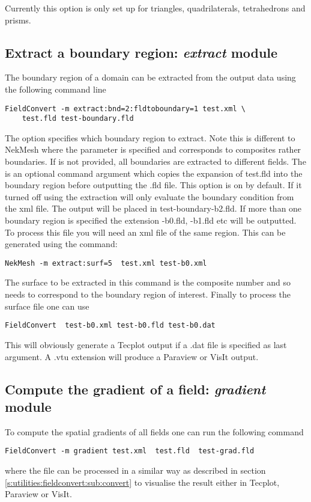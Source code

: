 \begin{notebox}
Currently this option is only set up for triangles, quadrilaterals,
tetrahedrons and prisms.
\end{notebox}

\subsection{Extract a boundary region: \textit{extract} module}
The boundary region of a domain can be extracted from the output
data using the following command line
%
\begin{lstlisting}[style=BashInputStyle]
FieldConvert -m extract:bnd=2:fldtoboundary=1 test.xml \
	test.fld test-boundary.fld
\end{lstlisting}
%
The option  specifies which boundary region to extract.
Note this is different to NekMesh where the parameter \inltt{surf}
is specified and corresponds to composites rather boundaries. If 
is not provided, all boundaries are extracted to different fields. The 
is an optional command argument which copies the expansion of test.fld into
the boundary region before outputting the .fld file. This option is on by default.
If it turned off using \inltt{fldtoboundary=0} the extraction will only evaluate the
boundary condition from the xml file. The output will be placed in test-boundary-b2.fld.
If more than one boundary region is specified the extension -b0.fld, -b1.fld etc will be
outputted. To process this file you will need an xml file of the same region.
This can be generated using the command:
%
\begin{lstlisting}[style=BashInputStyle]
NekMesh -m extract:surf=5  test.xml test-b0.xml
\end{lstlisting}
%
The surface to be extracted in this command is the composite
number and so needs to correspond to the boundary region
of interest. Finally to process the surface file one can use
%
\begin{lstlisting}[style=BashInputStyle]
FieldConvert  test-b0.xml test-b0.fld test-b0.dat
\end{lstlisting}
%
This will obviously generate a Tecplot output if a .dat file 
is specified as last argument. A .vtu extension will produce 
a Paraview or VisIt output.
%
%
%
\subsection{Compute the gradient of a field: \textit{gradient} module}
To compute the spatial gradients of all fields one can run the following command
%
\begin{lstlisting}[style=BashInputStyle]
FieldConvert -m gradient test.xml  test.fld  test-grad.fld
\end{lstlisting}
%
where the file  can be processed in a similar
way as described in section \ref{s:utilities:fieldconvert:sub:convert}
to visualise the result either in Tecplot, Paraview or VisIt.
%
%

